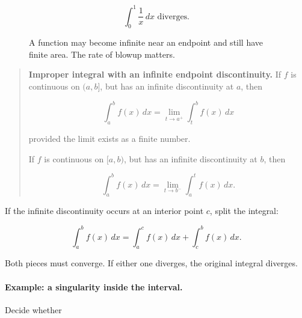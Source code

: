 \[
\boxed{
\int_0^1 \frac1x\,dx
\text{ diverges.}
}
\]

\begin{figure}[h]
\centering
{}
\caption{A function may become infinite near an endpoint and still have finite area.  The rate of blowup matters.}
\label{fig:infinite-discontinuity-comparison}
\end{figure}

\begin{quote}
\textbf{Improper integral with an infinite endpoint discontinuity.}
If \(f\) is continuous on \((a,b]\), but has an infinite discontinuity at \(a\), then

\[
\boxed{
\int_a^b f(x)\,dx
=
\lim_{t\to a^+}\int_t^b f(x)\,dx
}
\]

provided the limit exists as a finite number.

If \(f\) is continuous on \([a,b)\), but has an infinite discontinuity at \(b\), then

\[
\boxed{
\int_a^b f(x)\,dx
=
\lim_{t\to b^-}\int_a^t f(x)\,dx.
}
\]
\end{quote}

If the infinite discontinuity occurs at an interior point \(c\), split the integral:

\[
\boxed{
\int_a^b f(x)\,dx
=
\int_a^c f(x)\,dx+\int_c^b f(x)\,dx.
}
\]

Both pieces must converge.  If either one diverges, the original integral diverges.

\paragraph{Example: a singularity inside the interval.}
Decide whether

